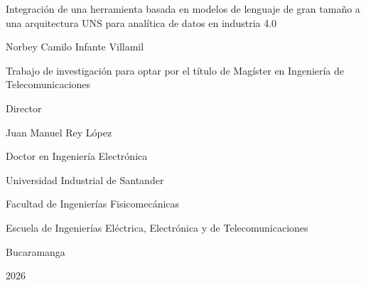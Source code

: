 \begin{titlepage}
\begin{center}

Integración de una herramienta basada en modelos de lenguaje de gran tamaño a una arquitectura UNS para analítica de datos en industria 4.0

\vspace*{3cm}

Norbey Camilo Infante Villamil

\vspace*{3cm}

Trabajo de investigación para optar por el título de Magíster en Ingeniería de Telecomunicaciones


\vspace*{2cm}


Director

Juan Manuel Rey López

Doctor en Ingeniería Electrónica
\vfill


Universidad Industrial de Santander

Facultad de Ingenierías Fisicomecánicas

Escuela de Ingenierías Eléctrica, Electrónica y de Telecomunicaciones

Bucaramanga

2026

\end{center}

\end{titlepage}
